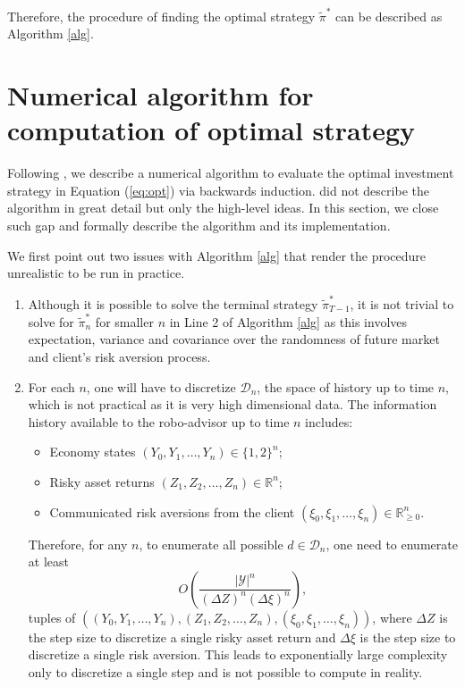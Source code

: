 Therefore, the procedure of finding the optimal strategy $\tilde\pi^*$ can be described as Algorithm \ref{alg}.

\section{Numerical algorithm for computation of optimal strategy}\label{sec:comp}
Following , we describe a numerical algorithm to evaluate the optimal investment strategy in Equation (\ref{eq:opt}) via backwards induction.  did not describe the algorithm in great detail but only the high-level ideas. In this section, we close such gap and formally describe the algorithm and its implementation.

We first point out two issues with Algorithm \ref{alg} that render the procedure unrealistic to be run in practice. \begin{enumerate}
    \item Although it is possible to solve the terminal strategy $\tilde\pi^*_{T-1}$, it is not trivial to solve for $\tilde\pi_n^*$ for smaller $n$ in Line 2 of Algorithm \ref{alg} as this involves expectation, variance and covariance over the randomness of future market and client's risk aversion process.
    \item For each $n$, one will have to discretize $\mathcal D_n$, the space of history up to time $n$, which is not practical as it is very high dimensional data. The information history available to the robo-advisor up to time $n$ includes:\begin{itemize}
        \item Economy states $(Y_0,Y_1,\ldots,Y_n)\in\{1,2\}^n$;
        \item Risky asset returns $(Z_1,Z_2,\ldots,Z_n)\in\mathbb{R}^n$;
        \item Communicated risk aversions from the client $(\xi_0,\xi_1,\ldots,\xi_n)\in\mathbb{R}_{\geq0}^n$.
    \end{itemize} Therefore, for any $n$, to enumerate all possible $d\in\mathcal D_n$, one need to enumerate at least \begin{equation}\label{eq:highdim}
        O\left(\frac{|\mathcal Y|^n}{(\Delta Z)^n(\Delta\xi)^n}\right),
    \end{equation}tuples of $((Y_0,Y_1,\ldots,Y_n), (Z_1,Z_2,\ldots,Z_n), (\xi_0,\xi_1,\ldots,\xi_n))$, where $\Delta Z$ is the step size to discretize a single risky asset return and $\Delta\xi$ is the step size to discretize a single risk aversion. This leads to exponentially large complexity only to discretize a single step and is not possible to compute in reality.
\end{enumerate}

